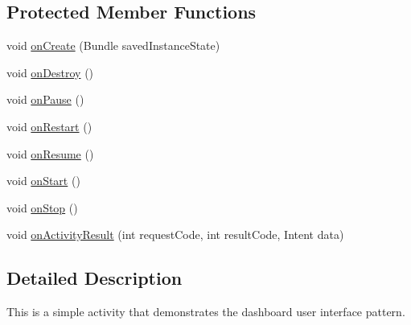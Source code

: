 \subsection*{Protected Member Functions}
\begin{DoxyCompactItemize}
\item 
void \hyperlink{classcom_1_1zia_1_1freshdocs_1_1activity_1_1_home_activity_a441c31d38668eeaee047662450a825b6}{on\-Create} (Bundle saved\-Instance\-State)
\item 
void \hyperlink{classcom_1_1zia_1_1freshdocs_1_1activity_1_1_home_activity_a07ce36dece44592580f7a98350edcaec}{on\-Destroy} ()
\item 
void \hyperlink{classcom_1_1zia_1_1freshdocs_1_1activity_1_1_home_activity_a699b7b817be1efec8f4a9ec32014d2ea}{on\-Pause} ()
\item 
void \hyperlink{classcom_1_1zia_1_1freshdocs_1_1activity_1_1_home_activity_ab9fcc976215fe4a1107fc0a27964a3d0}{on\-Restart} ()
\item 
void \hyperlink{classcom_1_1zia_1_1freshdocs_1_1activity_1_1_home_activity_a6c6526f9f676c0bb34390028b11a282e}{on\-Resume} ()
\item 
void \hyperlink{classcom_1_1zia_1_1freshdocs_1_1activity_1_1_home_activity_a2235db09391685ce284eeffbe2308996}{on\-Start} ()
\item 
void \hyperlink{classcom_1_1zia_1_1freshdocs_1_1activity_1_1_home_activity_a7a6855c1a623df368e73cf07b8d52193}{on\-Stop} ()
\item 
void \hyperlink{classcom_1_1zia_1_1freshdocs_1_1activity_1_1_home_activity_a117e0785b7e4ed3d69196f2994a960a4}{on\-Activity\-Result} (int request\-Code, int result\-Code, Intent data)
\end{DoxyCompactItemize}


\subsection{Detailed Description}
This is a simple activity that demonstrates the dashboard user interface pattern. 

